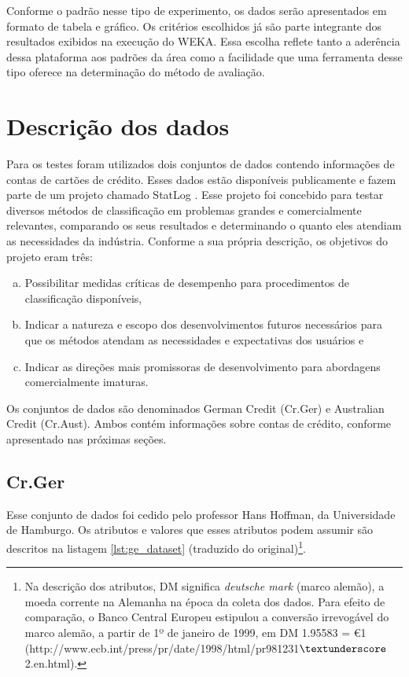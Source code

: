 Conforme o padrão nesse tipo de experimento, os dados serão apresentados em formato de tabela e gráfico. Os critérios escolhidos já são parte integrante dos resultados exibidos na execução do WEKA. Essa escolha reflete tanto a aderência dessa plataforma aos padrões da área como a facilidade que uma ferramenta desse tipo oferece na determinação do método de avaliação.

\section{Descrição dos dados}

Para os testes foram utilizados dois conjuntos de dados contendo informações de contas de cartões de crédito. Esses dados estão disponíveis publicamente e fazem parte de um projeto chamado StatLog \cite{Michie1994}. Esse projeto foi concebido para testar diversos métodos de classificação em problemas grandes e comercialmente relevantes, comparando os seus resultados e determinando o quanto eles atendiam as necessidades da indústria. Conforme a sua própria descrição, os objetivos do projeto eram três:

\begin{enumerate}[a)]
    \item Possibilitar medidas críticas de desempenho para procedimentos de classificação disponíveis,
    \item Indicar a natureza e escopo dos desenvolvimentos futuros necessários para que os métodos atendam as necessidades e expectativas dos usuários e
    \item Indicar as direções mais promissoras de desenvolvimento para abordagens comercialmente imaturas.
\end{enumerate}

Os conjuntos de dados são denominados German Credit (Cr.Ger) e Australian Credit (Cr.Aust). Ambos contém informações sobre contas de crédito, conforme apresentado nas próximas seções.

\subsection{Cr.Ger}

Esse conjunto de dados foi cedido pelo professor Hans Hoffman, da Universidade de Hamburgo. Os atributos e valores que esses atributos podem assumir são descritos na listagem \ref{lst:ge_dataset} (traduzido do original)\footnote{Na descrição dos atributos, DM significa \emph{deutsche mark} (marco alemão), a moeda corrente na Alemanha na época da coleta dos dados. Para efeito de comparação, o Banco Central Europeu estipulou a conversão irrevogável do marco alemão, a partir de 1º de janeiro de 1999, em DM 1.95583 = \euro 1 (http://www.ecb.int/press/pr/date/1998/html/pr981231$\textunderscore$2.en.html).}.

